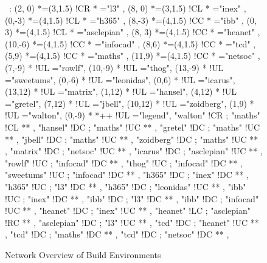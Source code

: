
\begin{figure}[!H]

\begin{center}

\ \xy<1cm,0cm>:
(2, 0)  	*=(3,1.5) !CR  						*\frm{-} ="l3" , 
(8, 0)  	*=(3,1.5) !CL  							*\frm{-} ="inex" , 
(0,-3) 	*=(4,1.5) !CL  					*\frm{-} ="h365" , 
(8,-3) 	*=(4,1.5) !CC  			*\frm{-} ="ibb" , 
(0, 3)  	*=(4,1.5) !CL  					*\frm{-} ="asclepian" , 
(8, 3)  	*=(4,1.5) !CC  						*\frm{-} ="heanet" , 
(10,-6)  *=(4,1.5) !CC  						*\frm{-} ="infocad" , 
(8,6)  	*=(4,1.5) !CC  			*\frm{-} ="tcd" , 
(5,9)  	*=(4,1.5) !CC  *\frm{-} ="maths" , 
(11,9)  	*=(4,1.5) !CC  						*\frm{-} ="netsoc" , 
%
\POS (7,-9) * !UL ="rowlf",
\POS (10,-9) * !UL ="thog",
\POS (13,-9) * !UL ="sweetums",
%
\POS (0,-6) * !UL ="leonidas",
%
\POS (0,6) * !UL ="icarus",
%
\POS (13,12) * !UL ="matrix",
%
\POS (1,12) * !UL ="hansel",
\POS (4,12) * !UL ="gretel",
\POS (7,12) * !UL ="jbell",
\POS (10,12) * !UL ="zoidberg",
\POS (1,9) * !UL ="walton",
%
\POS (0,-9) * *++\frm{-} !UL ="legend",
%
"walton" 	!CR ; "maths" 		!CL **\dir{=} ,
"hansel" 	!DC ; "maths" 		!UC **\dir{=} ,
"gretel" 	!DC ; "maths" 		!UC **\dir{=} ,
"jbell"  	!DC ; "maths" 		!UC **\dir{=} ,
"zoidberg"  !DC ; "maths" 		!UC **\dir{=} ,
%
"matrix"  	!DC ; "netsoc" 	!UC **\dir{-} ,
%
"icarus"  	!DC ; "asclepian" !UC **\dir{=} ,
%
"rowlf"  	!UC ; "infocad" 	!DC **\dir{=} ,
"thog"	  	!UC ; "infocad" 	!DC **\dir{=} ,
"sweetums" 	!UC ; "infocad" 	!DC **\dir{=} ,
%
"h365" 		!DC ; "inex" 		!DC **\dir{-} ,
"h365" 		!UC ; "l3" 			!DC **\dir{-} ,
"h365" 		!DC ; "leonidas" 	!UC **\dir{=} ,
%
"ibb" 		!UC ; "inex" 		!DC **\dir{-} ,
"ibb" 		!DC ; "l3" 			!DC **\dir{-} ,
"ibb" 		!DC ; "infocad" 	!UC **\dir{-} ,
%
"heanet" 	!DC ; "inex" 		!UC **\dir{=} ,
"heanet" 	!LC ; "asclepian" !RC **\dir{=} ,
%
"asclepian" !DC ; "l3" 			!UC **\dir{-} ,
%
"tcd" 		!DC ; "heanet" 	!UC **\dir{=} ,
"tcd" 		!DC ; "maths" 		!DC **\dir{=} ,
"tcd" 		!DC ; "netsoc" 	!DC **\dir{=} ,
\endxy

\end{center}

\caption{Network Overview of Build Environments}

\end{figure}

